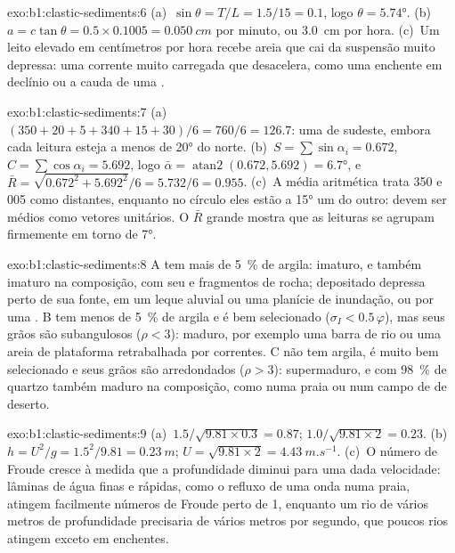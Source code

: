 \begin{solution}{exo:b1:clastic-sediments:6}
(a)~$\sin\theta = T/L = 1.5/15 = 0.1$, logo $\theta = \ang{5.74}$. (b)~$a =
c\tan\theta = 0.5 \times 0.1005 = \qty{0.050}{cm}$ por minuto, ou
\qty{3.0}{cm} por hora. (c)~Um leito elevado em centímetros por hora recebe areia que cai da suspensão muito depressa: uma corrente muito carregada que desacelera, como uma enchente em declínio ou a cauda de uma .
\end{solution}

\begin{solution}{exo:b1:clastic-sediments:7}
(a)~$(350 + 20 + 5 + 340 + 15 + 30)/6 = 760/6 = 126.7$: uma  de sudeste, embora cada leitura esteja a menos de \ang{20} do norte. (b)~$S =
\sum\sin\alpha_i = 0.672$, $C = \sum\cos\alpha_i = 5.692$, logo $\bar\alpha =
\operatorname{atan2}(0.672, 5.692) = \ang{6.7}$, e $\bar R =
\sqrt{0.672^2 + 5.692^2}/6 = 5.732/6 = 0.955$. (c)~A média aritmética trata 350 e 005 como distantes, enquanto no círculo eles estão a \ang{15} um do outro:  devem ser médios como vetores unitários. O $\bar R$ grande mostra que as leituras se agrupam firmemente em torno de \ang{7}.
\end{solution}

\begin{solution}{exo:b1:clastic-sediments:8}
A tem mais de \qty{5}{\percent} de argila: imaturo, e também imaturo na composição, com seu  e fragmentos de rocha; depositado depressa perto de sua fonte, em um leque aluvial ou uma planície de inundação, ou por uma . B tem menos de \qty{5}{\percent} de argila e é bem selecionado ($\sigma_I < 0.5\,\varphi$), mas seus grãos são subangulosos ($\rho < 3$): maduro, por exemplo uma barra de rio ou uma areia de plataforma retrabalhada por correntes. C não tem argila, é muito bem selecionado e seus grãos são arredondados ($\rho > 3$): supermaduro, e com \qty{98}{\percent} de quartzo também maduro na composição, como numa praia ou num campo de  de deserto.
\end{solution}

\begin{solution}{exo:b1:clastic-sediments:9}
(a)~$1.5/\sqrt{9.81 \times 0.3} = 0.87$; $1.0/\sqrt{9.81 \times 2} = 0.23$.
(b)~$h = U^2/g = 1.5^2/9.81 = \qty{0.23}{m}$; $U = \sqrt{9.81 \times 2} =
\qty{4.43}{m.s^{-1}}$. (c)~O número de Froude cresce à medida que a profundidade diminui para uma dada velocidade: lâminas de água finas e rápidas, como o refluxo de uma onda numa praia, atingem facilmente números de Froude perto de 1, enquanto um rio de vários metros de profundidade precisaria de vários metros por segundo, que poucos rios atingem exceto em enchentes.
\end{solution}


